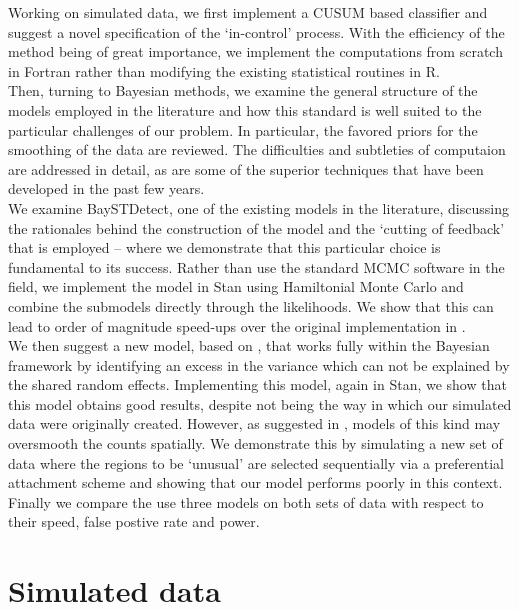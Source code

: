 \documentclass[11pt]{report}
\begin{document}
Working on simulated data, we first implement a CUSUM based classifier and suggest a novel specification of the `in-control' process. With the efficiency of the method being of great importance, we implement the computations from scratch in Fortran rather than modifying the existing statistical routines in R. \\

Then, turning to Bayesian methods, we examine the general structure of the models employed in the literature and how this standard is well suited to the particular challenges of our problem. In particular, the favored priors for the smoothing of the data are reviewed. The difficulties and subtleties of computaion are addressed in detail, as are some of the superior techniques that have been developed in the past few years. \\

We examine BaySTDetect, one of the existing models in the literature, discussing the rationales behind the construction of the model and the `cutting of feedback' that is employed -- where we demonstrate that this particular choice is fundamental to its success. Rather than use the standard MCMC software in the field, we implement the model in Stan using Hamiltonial Monte Carlo and combine the submodels directly through the likelihoods. We show that this can lead to order of magnitude speed-ups over the original implementation in \citet{baystdetect}. \\

We then suggest a new model, based on \citet{stability}, that works fully within the Bayesian framework by identifying an excess in the variance which can not be explained by the shared random effects. Implementing this model, again in Stan, we show that this model obtains good results, despite not being the way in which our simulated data were originally created. However, as suggested in \citet{best2005comparison}, models of this kind may oversmooth the counts spatially. We demonstrate this by simulating a new set of data where the regions to be `unusual' are selected sequentially via a preferential attachment scheme and showing that our model performs poorly in this context. \\

Finally we compare the use three models on both sets of data with respect to their speed, false postive rate and power.

\chapter{Simulated data}
\end{document}

